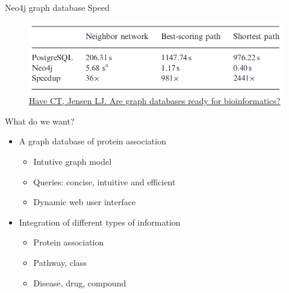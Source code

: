 \documentclass{beamer}
\begin{document}
\begin{frame}{Neo4j graph database}
Speed
    \begin{figure}
        \centering
        \includegraphics[width=0.7\linewidth]{graph-dbs-benchmark.png}
        \caption{\href{https://www.ncbi.nlm.nih.gov/pmc/articles/PMC3842757/}{Have CT, Jensen LJ. Are graph databases ready for bioinformatics?}}
    \end{figure}
\end{frame}

\begin{frame}{What do we want?}

\begin{itemize}
    \item A graph database of protein association
    \begin{itemize}
        \item Intutive graph model 
        \item Queries: concise, intuitive and efficient
        \item Dynamic web user interface %
    \end{itemize}
    \vfill
    \item Integration of different types of information
    \begin{itemize}
        \item Protein association
        \item Pathway, class
        \item Disease, drug, compound
    \end{itemize}
    \vfill
\end{itemize}
\end{frame}

\end{document}
